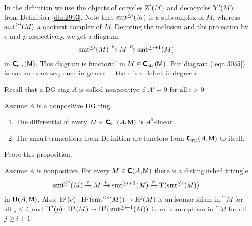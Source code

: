 In the definition we use the objects of cocycles $\operatorname{Z}^i(M)$
and decocycles $\operatorname{Y}^i(M)$ from Definition \ref{dfn:2993}. Note that 
$\operatorname{smt}^{\leq i}(M)$ is a subcomplex of $M$, whereas 
$\operatorname{smt}^{\geq i}(M)$ a quotient complex of $M$. Denoting the inclusion and 
the projection by $e$ and $p$ respectively, we get a diagram 
\begin{equation} \label{eqn:3035}
\operatorname{smt}^{\leq i}(M) \xrightarrow{e} M \xrightarrow{p} \operatorname{smt}^{\geq i + 1}(M) 
\end{equation}
in $\boldsymbol{\mathsf{C}}_{\mathrm{str}}(\operatorname{\mathsf{M}})$. 
This diagram is functorial in $M \in \boldsymbol{\mathsf{C}}_{\mathrm{str}}(\operatorname{\mathsf{M}})$.
But diagram (\ref{eqn:3035}) is not an exact sequence in general  -- there is a 
defect in degree $i$. 

Recall that a DG ring $A$ is called nonpositive if $A^i = 0$ for all $i > 0$. 

\begin{prop} \label{prop:3170}
Assume $A$ is a nonpositive DG ring. 
\begin{enumerate}
\item The differential of every 
$M \in \boldsymbol{\mathsf{C}}_{\mathrm{str}}(A, \operatorname{\mathsf{M}})$ is $A^0$-linear.

\item The smart truncations from Definition \tup{\ref{dfn:2320}}
are functors from $\boldsymbol{\mathsf{C}}_{\mathrm{str}}(A, \operatorname{\mathsf{M}})$ to itself. 
\end{enumerate}
\end{prop}

\begin{exer} \label{exer:3170}
Prove this proposition. 
\end{exer}

\begin{prop} \label{prop:2320}
Assume $A$ is nonpositive. 
For every $M \in \boldsymbol{\mathsf{C}}(A, \operatorname{\mathsf{M}})$ there is a distinguished triangle
\[ \operatorname{smt}^{\leq i}(M) \xrightarrow{e} M \xrightarrow{p} \operatorname{smt}^{\geq i + 1}(M) 
\xrightarrow{\theta} \operatorname{T}(\operatorname{smt}^{\leq i}(M)) \]
in $\boldsymbol{\mathsf{D}}(A, \operatorname{\mathsf{M}})$. Also, 
$\operatorname{H}^j(e) :  \operatorname{H}^j(\operatorname{smt}^{\leq i}(M))  \to \operatorname{H}^j(M)$
is an isomorphism in $\cat{M}$ for all $j \leq i$, and 
$\operatorname{H}^j(p) : \operatorname{H}^j(M) \to \operatorname{H}^j(\operatorname{smt}^{\geq i + 1}(M))$
is an isomorphism in $\cat{M}$ for all $j \geq i + 1$.
\end{prop}

